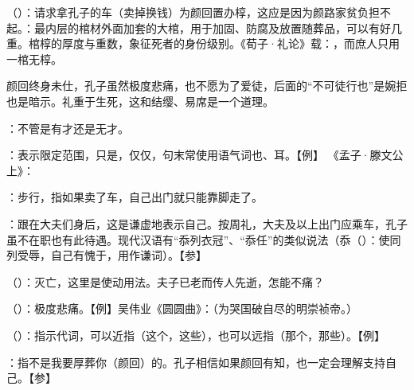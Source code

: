{
\item {}（）：请求拿孔子的车（卖掉换钱）为颜回置办椁，这应是因为颜路家贫负担不起。：最内层的棺材外面加套的大棺，用于加固、防腐及放置随葬品，可以有好几重。棺椁的厚度与重数，象征死者的身份级别。《荀子·礼论》载：，而庶人只用一棺无椁。

颜回终身未仕，孔子虽然极度悲痛，也不愿为了爱徒，后面的“不可徒行也”是婉拒也是暗示。礼重于生死，这和结缨、易席是一个道理。
\item {}：不管是有才还是无才。
\item {}：表示限定范围，只是，仅仅，句末常使用语气词也、耳。【例】 《孟子·滕文公上》：
\item {}：步行，指如果卖了车，自己出门就只能靠脚走了。
\item {}：跟在大夫们身后，这是谦虚地表示自己。按周礼，大夫及以上出门应乘车，孔子虽不在职也有此待遇。现代汉语有“忝列衣冠”、“忝任”的类似说法（忝（）：使同列受辱，自己有愧于，用作谦词）。【参】
}
{}


{
\item {}（）：灭亡，这里是使动用法。夫子已老而传人先逝，怎能不痛？ %
}
{}


{
\item {}（）：极度悲痛。【例】吴伟业《圆圆曲》：（为哭国破自尽的明崇祯帝。）
\item {}（）：指示代词，可以近指（这个，这些），也可以远指（那个，那些）。【例】   
}
{}


{
\item {}：指不是我要厚葬你（颜回）的。孔子相信如果颜回有知，也一定会理解支持自己。【参】
}
{}


